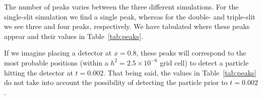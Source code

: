 \documentclass[aps,pra,reprint,amsmath,amssymb,twocolumn,preprintnumbers,superscriptaddress,10pt]{revtex4-2}
\begin{document}
The number of peaks varies between the three different simulations.
For the single-slit simulation we find a single peak, whereas for the double- and triple-slit we see three and four peaks, respectively.
We have tabulated where these peaks appear and their values in Table~\ref{tab:peaks}.

\begin{table}[h!]
\centering
{}
\caption{Number of peaks, together with their positions and values, for the single-, double- and triple-slit simulation appearing in Figure~\ref{fig:probability_x0p8}.}
\label{tab:peaks}
\end{table}

If we imagine placing a detector at \(x=0.8\), these peaks will correspond to the most probable positions (within a \(h^2=2.5\times 10^{-6}\) grid cell) to detect a particle hitting the detector at \(t=0.002\). 
That being said, the values in Table~\ref{tab:peaks} do not take into account the possibility of detecting the particle prior to \(t=0.002\).
\end{document}
